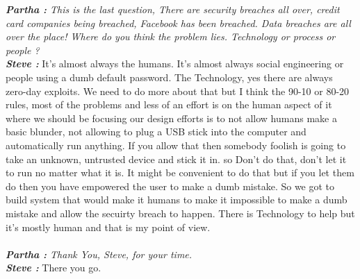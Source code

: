 \documentclass[a4paper, 12pt]{article}
\begin{document}
\begin{flushleft}
        \textit {\textbf {Partha :} This is the last question,  There are security breaches all over, credit card  companies being breached, Facebook has been breached. Data breaches are all over the place! Where do you think the problem lies. Technology or process or people ?} \\
        \textit {\textbf {Steve :}}  It’s almost always the humans. It’s almost always social engineering or people using a dumb default password. The Technology, yes there are always zero-day exploits. We need to do more about that but I think  the 90-10 or 80-20 rules, most of the problems and less of an effort is on the human aspect of it where we should be focusing our design efforts is to not allow humans make a basic blunder, not allowing to plug a USB stick into the computer and automatically run anything. If you allow that then somebody foolish is going to take an unknown, untrusted device and stick it in. so  Don’t do that, don’t let it to run no matter what it is.  It might be convenient to do that but if you let them do then you have empowered the user to make a dumb mistake. So we got to build system that would make it humans to make it impossible to make a dumb mistake and allow the secuirty breach to happen. There is Technology to help but it’s mostly human and that is my point of view. \\~\\

        \textit {\textbf {Partha :} Thank You, Steve, for your time. \\}
        \textit {\textbf {Steve :}} There you go. \\~\\




\end{flushleft}
\end{document}
